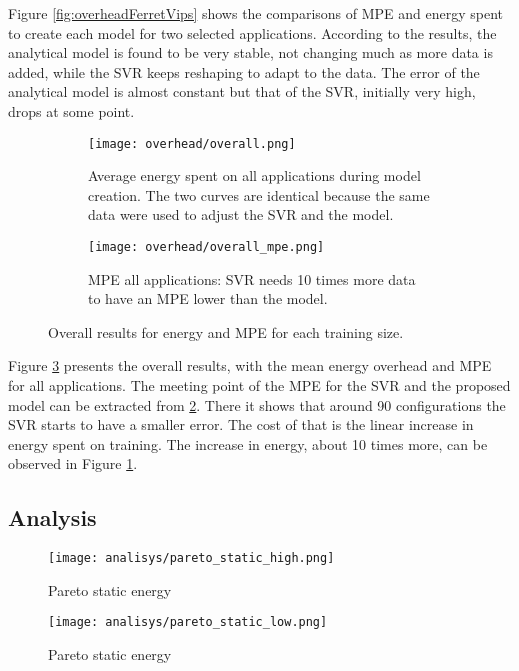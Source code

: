 \documentclass{ieeeaccess}
\begin{document}
Figure \ref{fig:overheadFerretVips} shows the comparisons of MPE and energy spent to create each model for two selected applications. According to the results, the analytical model is found to be very stable, not changing much as more data is added, while the SVR keeps reshaping to adapt to the data. 
The error of the analytical model is almost constant but that of  the SVR, initially very high, drops at some point.
\begin{figure}[H]
    \centering
    \begin{subfigure}[b]{0.44\textwidth}
    	\centerline{\texttt{[image: overhead/overall.png]}}
        \caption{Average energy spent on all applications during model creation. The two curves are identical because the same data were used to adjust the SVR and the model.}
    	\label{fig:overall_overhead}
    \end{subfigure}
    \quad
    \begin{subfigure}[b]{0.44\textwidth}
    	\centerline{\texttt{[image: overhead/overall\_mpe.png]}}
        \caption{
        MPE all applications: SVR needs 10 times more data to have an MPE lower than the model.}
    	\label{fig:overall_MPE}
    \end{subfigure}
    \caption{Overall results for energy and MPE for each training size.}
    \label{fig:overall_train}
\end{figure}
Figure \ref{fig:overall_train} presents the overall results, with the mean energy overhead and MPE for all applications.
The meeting point of the MPE for the SVR and the proposed model can be extracted from  \ref{fig:overall_MPE}.
There it shows that around 90 configurations the SVR starts to have a smaller error. The cost of that is the linear increase in energy spent on training. The increase in energy, about 10 times more, can be observed in Figure \ref{fig:overall_overhead}.

\subsection{Analysis}

\begin{figure}
    \centering
    \texttt{[image: analisys/pareto\_static\_high.png]}
    \caption{Pareto static energy}
    \label{fig:pareto_static_h}
\end{figure}


\begin{figure}
    \centering
    \texttt{[image: analisys/pareto\_static\_low.png]}
    \caption{Pareto static energy}
    \label{fig:pareto_static_l}
\end{figure}
\end{document}
